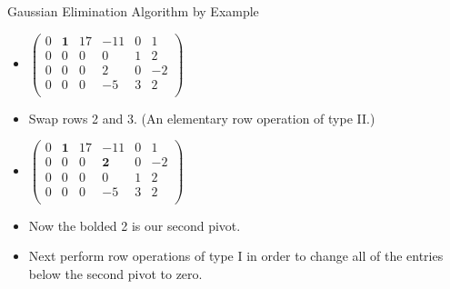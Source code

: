 \documentclass{beamer}
\begin{document}
\begin{frame}{Gaussian Elimination Algorithm by Example}

\begin{itemize}
\item $
\begin{pmatrix}
0 & \textbf{1} &  17   &  -11   &  0  &  1   \\
0 &         0  &   0   &   0    &  1  &  2   \\
0 &         0  &   0   &   2   &   0  &  -2  \\
0 &         0  &   0   &  -5   &   3  &  2   \\
\end{pmatrix}
$
\item Swap rows 2 and 3. (An elementary row operation of type II.)
\item $
\begin{pmatrix}
0 & \textbf{1} &  17   &          -11   &  0  &  1  \\
0 &         0  &   0   &   \textbf{2}   &  0  &  -2 \\
0 &         0  &   0   &           0    &  1  &  2 \\
0 &         0  &   0   &          -5    &  3  &  2 \\
\end{pmatrix}
$
\item Now the bolded 2 is our second pivot.
\item Next perform row operations of type I in order to change all of the
entries below the second pivot to zero.
\end{itemize}
\end{frame}

\end{document}
